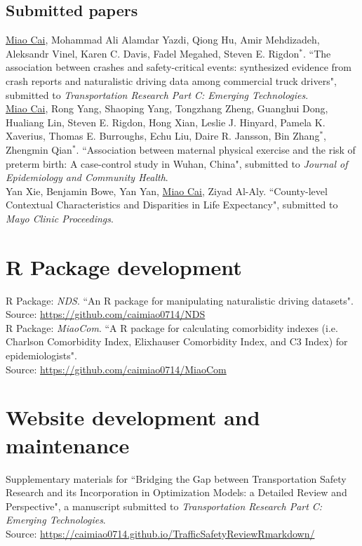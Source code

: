 \documentclass[11pt, a4paper]{article}
\newcommand{\years}[1]{\marginnote{\scriptsize #1}}
\begin{document}
\subsection*{Submitted papers}
\noindent
\years{2019}\underline{Miao Cai},  Mohammad Ali Alamdar Yazdi, Qiong Hu, Amir Mehdizadeh, Aleksandr Vinel, Karen C. Davis, Fadel Megahed, Steven E. Rigdon$^\ast$. ``The association between crashes and safety-critical events: synthesized evidence from crash reports and naturalistic driving data among commercial truck drivers", submitted to \emph{Transportation Research Part C: Emerging Technologies}.\\
\years{2019}\underline{Miao Cai}, Rong Yang, Shaoping Yang, Tongzhang Zheng, Guanghui Dong, Hualiang Lin, Steven E. Rigdon, Hong Xian, Leslie J. Hinyard, Pamela K. Xaverius, Thomas E. Burroughs, Echu Liu, Daire R. Jansson, Bin Zhang$^\ast$, Zhengmin Qian$^\ast$. ``Association between maternal physical exercise and the risk of preterm birth: A case-control study in Wuhan, China", submitted to \emph{Journal of Epidemiology and Community Health}.\\
\years{2019}Yan Xie, Benjamin Bowe, Yan Yan, \underline{Miao Cai}, Ziyad Al-Aly. ``County-level Contextual Characteristics and Disparities in Life Expectancy", submitted to \emph{Mayo Clinic Proceedings}.


\section*{R Package development}
\years{2019}R Package: \emph{NDS}. ``An R package for manipulating naturalistic driving datasets". \\ Source: \href{https://github.com/caimiao0714/NDS}{https://github.com/caimiao0714/NDS}\\
\years{2017}R Package: \emph{MiaoCom}. ``A R package for calculating comorbidity indexes (i.e. Charlson Comorbidity Index, Elixhauser Comorbidity Index, and C3 Index) for epidemiologists". \\ Source: \href{https://github.com/caimiao0714/MiaoCom}{https://github.com/caimiao0714/MiaoCom}

\section*{Website development and maintenance}
\years{2019}Supplementary materials for ``Bridging the Gap between Transportation Safety Research and its Incorporation in Optimization Models: a Detailed Review and Perspective", a manuscript submitted to \emph{Transportation Research Part C: Emerging Technologies}. \\
Source: \href{https://caimiao0714.github.io/TrafficSafetyReviewRmarkdown/}{https://caimiao0714.github.io/TrafficSafetyReviewRmarkdown/}
\end{document}
